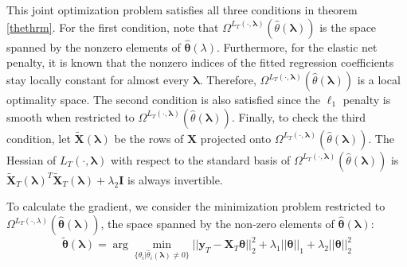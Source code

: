 \documentclass[10pt,letterpaper]{article}
\begin{document}
This joint optimization problem satisfies all three conditions in theorem \ref{thethrm}. For the first condition, note that $\Omega^{L_T(\cdot, \boldsymbol{\lambda})}(\hat{\theta}\left(\boldsymbol{\lambda}\right))$ is the space spanned by the nonzero elements of $\hat {\boldsymbol \theta}(\lambda)$. Furthermore, for the elastic net penalty, it is known that the nonzero indices of the fitted regression coefficients stay locally constant for almost every $\boldsymbol{\lambda}$. Therefore, $\Omega^{L_T(\cdot, \boldsymbol{\lambda})}(\hat{\theta}\left(\boldsymbol{\lambda}\right))$ is a local optimality space. The second condition is also satisfied since the $\ell_1$ penalty is smooth when restricted to $\Omega^{L_T(\cdot, \boldsymbol{\lambda})}(\hat{\theta}\left(\boldsymbol{\lambda}\right))$. Finally, to check the third condition, let $\tilde{\boldsymbol{X}}(\boldsymbol{\lambda})$ be the rows of $\boldsymbol{X}$ projected onto $\Omega^{L_T(\cdot, \boldsymbol{\lambda})}(\hat{\theta}\left(\boldsymbol{\lambda}\right))$. The Hessian of $L_T(\cdot, \boldsymbol{\lambda})$ with respect to the standard basis of $\Omega^{L_T(\cdot, \boldsymbol{\lambda})}(\hat{\theta}\left(\boldsymbol{\lambda}\right))$ is $\tilde{\boldsymbol{X}}_T(\boldsymbol{\lambda})^T \tilde{\boldsymbol{X}}_T(\boldsymbol{\lambda}) + \lambda_2 \boldsymbol{I}$ is always invertible.

To calculate the gradient, we consider the minimization problem restricted to $\Omega^{L_T(\cdot, \lambda)}(\hat{\boldsymbol{\theta}}\left(\boldsymbol{\lambda}\right))$, the space spanned by the non-zero elements of $\hat{\boldsymbol{\theta}}(\boldsymbol{\lambda})$:
\begin{equation}
\tilde{\boldsymbol{\theta}}(\boldsymbol{\lambda}) = \arg \min_{\{\theta_i | \hat{\theta}_i(\boldsymbol{\lambda}) \ne 0 \} } ||\boldsymbol{y}_T - \boldsymbol{X}_T \boldsymbol{\theta}||^2_2 + \lambda_1 ||\boldsymbol{\theta}||_1 + \lambda_2 ||\boldsymbol{\theta}||_2^2
\end{equation}
\end{document}
